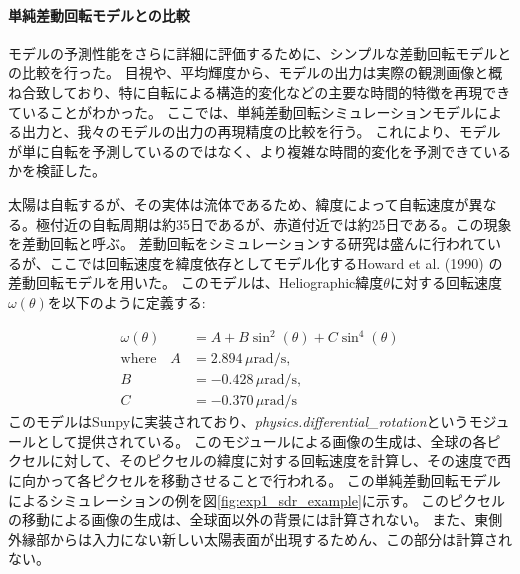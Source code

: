         \paragraph{単純差動回転モデルとの比較}
          モデルの予測性能をさらに詳細に評価するために、シンプルな差動回転モデルとの比較を行った。
          目視や、平均輝度から、モデルの出力は実際の観測画像と概ね合致しており、特に自転による構造的変化などの主要な時間的特徴を再現できていることがわかった。
          ここでは、単純差動回転シミュレーションモデルによる出力と、我々のモデルの出力の再現精度の比較を行う。
          これにより、モデルが単に自転を予測しているのではなく、より複雑な時間的変化を予測できているかを検証した。

          太陽は自転するが、その実体は流体であるため、緯度によって自転速度が異なる。極付近の自転周期は約35日であるが、赤道付近では約25日である。この現象を差動回転と呼ぶ。
          差動回転をシミュレーションする研究は盛んに行われているが、ここでは回転速度を緯度依存としてモデル化するHoward et al. (1990) \cite{howard1990solar}の差動回転モデルを用いた。
          このモデルは、Heliographic緯度\(\theta\)に対する回転速度\(\omega(\theta)\)を以下のように定義する:
          
          \begin{align}
            \omega(\theta) &= A + B \sin^{2}(\theta) + C \sin^{4}(\theta) \\
            \text{where} \quad A &= 2.894 \, \mu\text{rad/s}, \\
            B &= -0.428 \, \mu\text{rad/s}, \\
            C &= -0.370 \, \mu\text{rad/s}
          \end{align}
          このモデルはSunpyに実装されており、\textit{physics.differential\_rotation}というモジュールとして提供されている。
          このモジュールによる画像の生成は、全球の各ピクセルに対して、そのピクセルの緯度に対する回転速度を計算し、その速度で西に向かって各ピクセルを移動させることで行われる。
          この単純差動回転モデルによるシミュレーションの例を図\ref{fig:exp1_sdr_example}に示す。
          このピクセルの移動による画像の生成は、全球面以外の背景には計算されない。
          また、東側外縁部からは入力にない新しい太陽表面が出現するためん、この部分は計算されない。

